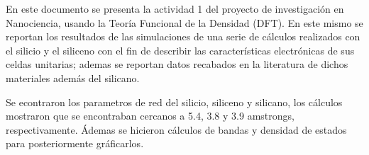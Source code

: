 
\noindent 				%

En este documento se presenta la actividad 1 del proyecto de investigación en Nanociencia,
usando la Teoría Funcional de la Densidad (DFT). 
En este mismo se reportan los resultados de las simulaciones de una serie de cálculos 
realizados con el silicio y el siliceno con el fin de describir las características electrónicas de sus
celdas unitarias; ademas se reportan datos recabados en la literatura de dichos 
materiales además del silicano.


Se econtraron los parametros de red del silicio, siliceno y silicano, los cálculos mostraron
que se encontraban cercanos a 5.4, 3.8 y 3.9 amstrongs, respectivamente. 
Ádemas se hicieron cálculos de bandas y densidad de estados para posteriormente 
gráficarlos.